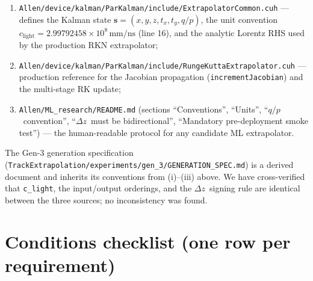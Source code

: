 \documentclass[11pt,a4paper]{article}
\newcommand{\dz}{\ensuremath{\Delta z}}
\newcommand{\qop}{\ensuremath{q/p}}
\newcommand{\state}{\ensuremath{\mathbf{s}}}
\begin{document}
\begin{enumerate}[label=(\roman*),leftmargin=2em,nosep]
\item \texttt{Allen/device/kalman/ParKalman/include/ExtrapolatorCommon.cuh}
      --- defines the Kalman state $\state=(x,y,z,t_x,t_y,\qop)$, the unit
      convention $c_\text{light}=2.99792458{\times}10^{8}\,\text{mm/ns}$
      (line 16), and the analytic Lorentz RHS used by the production RKN
      extrapolator;
\item \texttt{Allen/device/kalman/ParKalman/include/RungeKuttaExtrapolator.cuh}
      --- production reference for the Jacobian propagation
      (\texttt{incrementJacobian}) and the multi-stage RK update;
\item \texttt{Allen/ML\_research/README.md} (sections ``Conventions'',
      ``Units'', ``\qop\ convention'', ``\dz\ must be bidirectional'',
      ``Mandatory pre-deployment smoke test'') --- the human-readable
      protocol for any candidate ML extrapolator.
\end{enumerate}

The Gen-3 generation specification
(\texttt{TrackExtrapolation/experiments/gen\_3/GENERATION\_SPEC.md})
is a derived document and inherits its conventions from
(i)--(iii) above. We have cross-verified that
\texttt{c\_light}, the input/output orderings, and the \dz\ signing
rule are identical between the three sources; no inconsistency was
found.

\section{Conditions checklist (one row per requirement)}
\end{document}
